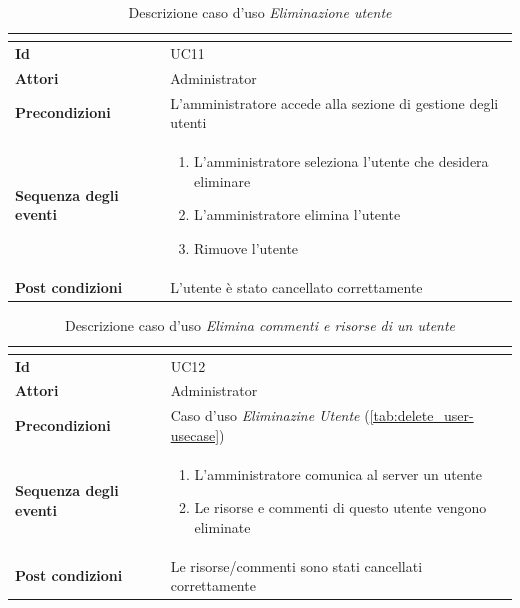 \documentclass[a4paper]{article}
\begin{document}
\begin{table}[H]
    \centering
    \renewcommand{\arraystretch}{1.5}
    \begin{tabular}{|>{\bfseries}l|p{10cm}|}
        \hline
        \multicolumn{2}{|c|}{\textbf{Caso d'uso: Eliminazione utente}} \\
        \hline
        \textbf{Id} & UC11 \\ \hline
        \textbf{Attori} & Administrator \\ \hline
        \textbf{Precondizioni} & L'amministratore accede alla sezione di gestione degli utenti \\ \hline
        \textbf{Sequenza degli eventi} &
        \begin{enumerate}
            \item L'amministratore seleziona l'utente che desidera eliminare
            \item L'amministratore elimina l'utente
            \item Rimuove l'utente
        \end{enumerate}\\ \hline
        \textbf{Post condizioni} & L'utente è stato cancellato correttamente \\ \hline
    \end{tabular}
    \caption{Descrizione caso d'uso \textit{Eliminazione utente}}
    \label{tab:delete_user-usecase}
\end{table}

\begin{table}[H]
    \centering
    \renewcommand{\arraystretch}{1.5}
    \begin{tabular}{|>{\bfseries}l|p{10cm}|}
        \hline
        \multicolumn{2}{|c|}{\textbf{Caso d'uso: Elimina commenti e risorse di un utente}} \\
        \hline
        \textbf{Id} & UC12 \\ \hline
        \textbf{Attori} & Administrator \\ \hline
        \textbf{Precondizioni} & Caso d'uso \textit{Eliminazine Utente} (\autoref{tab:delete_user-usecase}) \\ \hline
        \textbf{Sequenza degli eventi} &
        \begin{enumerate}
            \item L'amministratore comunica al server un utente
            \item Le risorse e commenti di questo utente vengono eliminate
        \end{enumerate}\\ \hline
        \textbf{Post condizioni} & Le risorse/commenti sono stati cancellati correttamente \\ \hline
    \end{tabular}
    \caption{Descrizione caso d'uso \textit{Elimina commenti e risorse di un utente}}
    \label{tab:delete_user_comments_resources-usecase}
\end{table}
\end{document}
